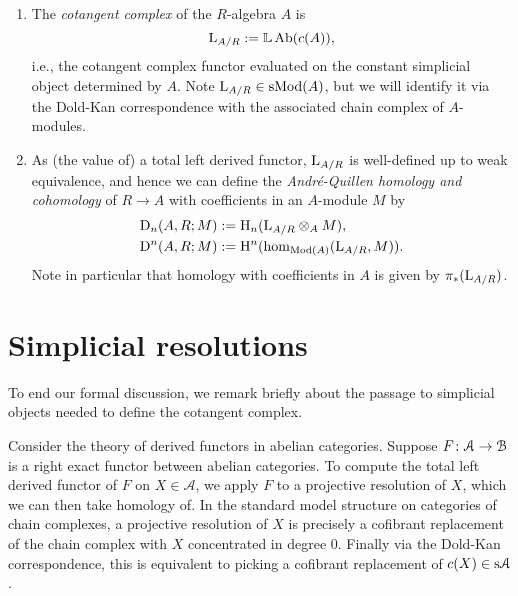 \begin{definitions}
  \begin{enumerate}[leftmargin=*]
  \item The \emph{cotangent complex} of the $R$-algebra
    $A$ is
    \[
    \mathrm{L}_{A/R} \mathrel{:=} \mathbb{L}\operatorname{Ab}(c(A)),
    \]
    i.e., the cotangent complex functor evaluated on the constant
    simplicial object determined by $A$. Note $\mathrm{L}_{A/R} \in
    \mathrm{s}\mathrm{Mod}(A)$, but we will identify it via the Dold-Kan
    correspondence with the associated chain complex of $A$-modules.
  \item As (the value of) a total left derived functor, $\mathrm{L}_{A/R}$
    is well-defined up to weak equivalence, and hence we can define
    the \emph{Andr\'e-Quillen homology and cohomology} of $R \to A$
    with coefficients in an $A$-module $M$ by
    \begin{align*}
      \mathrm{D}_n(A,R;M) &\mathrel{:=} \mathrm{H}_n(\mathrm{L}_{A/R} \otimes_A M),\\ \mathrm{D}^n(A,R;M)
      &\mathrel{:=} \mathrm{H}^n(\operatorname{hom}_{\mathrm{Mod}(A)}(\mathrm{L}_{A/R}, M)).
    \end{align*}
    Note in particular that homology with coefficients in $A$ is given
    by $\pi_*(\mathrm{L}_{A/R})$.
  \end{enumerate}
\end{definitions}


\section{Simplicial resolutions}

To end our formal discussion, we remark briefly about the passage to
simplicial objects needed to define the cotangent complex.

\renewcommand{\A}{\mathcal{A}}
\renewcommand{\B}{\mathcal{B}}

Consider the theory of derived functors in abelian categories. Suppose
$F \c \A \to \B$ is a right exact functor between abelian
categories. To compute the total left derived functor of $F$ on $X \in
\A$, we apply $F$ to a projective resolution of $X$, which we can then
take homology of. In the standard model structure on categories of
chain complexes, a projective resolution of $X$ is precisely a
cofibrant replacement of the chain complex with $X$ concentrated in
degree $0$. Finally via the Dold-Kan correspondence, this is
equivalent to picking a cofibrant replacement of $c(X) \in \s\A$.

